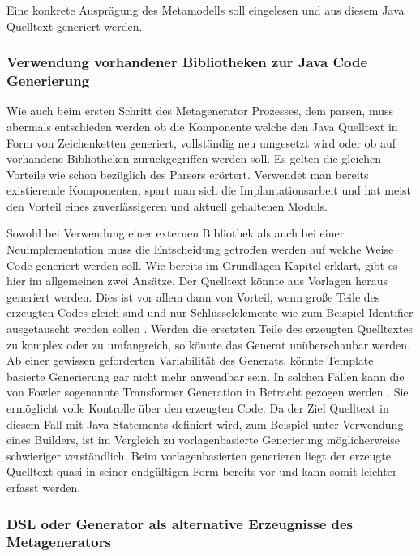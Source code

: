 \documentclass[12pt,oneside,a4paper,parskip]{scrbook}
\begin{document}
Eine konkrete Ausprägung des Metamodells soll eingelesen und aus diesem Java Quelltext generiert werden.

\subsubsection{Verwendung vorhandener Bibliotheken zur Java Code Generierung}

Wie auch beim ersten Schritt des Metagenerator Prozesses, dem parsen, muss abermals entschieden werden ob die Komponente welche den Java Quelltext in Form von Zeichenketten generiert, vollständig neu umgesetzt wird oder ob auf vorhandene Bibliotheken zurückgegriffen werden soll. Es gelten die gleichen Vorteile wie schon bezüglich des Parsers erörtert. Verwendet man bereits existierende Komponenten, spart man sich die Implantationsarbeit und hat meist den Vorteil eines zuverlässigeren und aktuell gehaltenen Moduls.

Sowohl bei Verwendung einer externen Bibliothek als auch bei einer Neuimplementation muss die Entscheidung getroffen werden auf welche Weise Code generiert werden soll. Wie bereits im Grundlagen Kapitel erklärt, gibt es hier im allgemeinen zwei Ansätze. Der Quelltext könnte aus Vorlagen heraus generiert werden. Dies ist vor allem dann von Vorteil, wenn große Teile des erzeugten Codes gleich sind und nur Schlüsselelemente wie zum Beispiel Identifier ausgetauscht werden sollen \cite[S. 125]{fowler2010}. Werden die ersetzten Teile des erzeugten Quelltextes zu komplex oder zu umfangreich, so könnte das Generat unüberschaubar werden. Ab einer gewissen geforderten Variabilität des Generats, könnte Template basierte Generierung gar nicht mehr anwendbar sein. In solchen Fällen kann die von Fowler sogenannte Transformer Generation in Betracht gezogen werden \cite[S. 125]{fowler2010}. Sie ermöglicht volle Kontrolle über den erzeugten Code. Da der Ziel Quelltext in diesem Fall mit Java Statements definiert wird, zum Beispiel unter Verwendung eines Builders, ist im Vergleich zu vorlagenbasierte Generierung möglicherweise schwieriger verständlich. Beim vorlagenbasierten generieren liegt der erzeugte Quelltext quasi in seiner endgültigen Form bereits vor und kann somit leichter erfasst werden.

\subsubsection{DSL oder Generator als alternative Erzeugnisse des Metagenerators}
\end{document}
